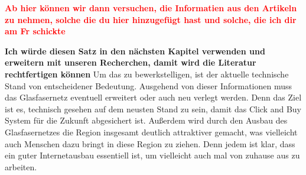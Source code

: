 \textbf{\textcolor{red}{Ab hier können wir dann versuchen, die Informatien aus den Artikeln zu nehmen, solche
die du hier hinzugefügt hast und solche, die ich dir am Fr schickte}}

\vspace{2cm}
\textbf{Ich würde diesen Satz in den nächsten Kapitel verwenden und erweitern mit unseren Recherchen, damit wird 
die Literatur rechtfertigen können}
Um das zu bewerkstelligen, ist der aktuelle technische Stand von entscheidener Bedeutung. 
Ausgehend von dieser Informationen muss das Glasfasernetz eventuell erweitert oder auch neu verlegt werden.
Denn das Ziel ist es, technisch gesehen auf dem neusten Stand zu sein, damit das Click and Buy System für die Zukunft abgesichert ist.
Außerdem wird durch den Ausbau des Glasfasernetzes die Region insgesamt deutlich attraktiver gemacht, was vielleicht auch Menschen dazu bringt
in diese Region zu ziehen. Denn jedem ist klar, dass ein guter Internetausbau essentiell ist, um vielleicht auch mal von zuhause aus zu arbeiten.